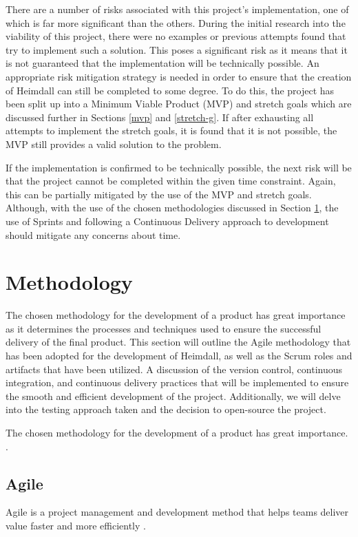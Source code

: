 \documentclass{article}
\begin{document}
There are a number of risks associated with this project's implementation, one of which is far more significant than the others. During the initial research into the viability of this project, there were no examples or previous attempts found that try to implement such a solution. This poses a significant risk as it means that it is not guaranteed that the implementation will be technically possible. An appropriate risk mitigation strategy is needed in order to ensure that the creation of Heimdall can still be completed to some degree. To do this, the project has been split up into a Minimum Viable Product (MVP) and stretch goals which are discussed further in Sections \ref{mvp} and \ref{stretch-g}. If after exhausting all attempts to implement the stretch goals, it is found that it is not possible, the MVP still provides a valid solution to the problem. \\\par If the implementation is confirmed to be technically possible, the next risk will be that the project cannot be completed within the given time constraint. Again, this can be partially mitigated by the use of the MVP and stretch goals. Although, with the use of the chosen methodologies discussed in Section \ref{methodology}, the use of Sprints and following a Continuous Delivery approach to development should mitigate any concerns about time.



 
\section{Methodology} \label{methodology}

The chosen methodology for the development of a product has great importance as it determines the processes and techniques used to ensure the successful delivery of the final product. This section will outline the Agile methodology that has been adopted for the development of Heimdall, as well as the Scrum roles and artifacts that have been utilized. A discussion of the version control, continuous integration, and continuous delivery practices that will be implemented to ensure the smooth and efficient development of the project. Additionally, we will delve into the testing approach taken and the decision to open-source the project.

The chosen methodology for the development of a product has great importance.  \cite{agile-waterfall}.



\subsection{Agile} \label{agile}
Agile is a project management and development method that helps teams deliver value faster and more efficiently \cite{what-is-agile}. 
\end{document}
